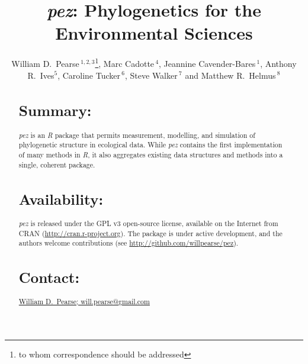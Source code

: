 \documentclass{bioinfo}
\begin{document}

\title[\emph{pez}]{\emph{pez}: Phylogenetics for the Environmental
  Sciences} \author[Pearse \textit{et~al}]{William D.\
  Pearse\,$^{1,2,3}$\footnote{to whom correspondence should be
    addressed}, Marc Cadotte\,$^{4}$, Jeannine Cavender-Bares\,$^1$,
  Anthony R.\ Ives$^5$, Caroline Tucker\,$^6$, Steve Walker\,$^7$ and
  Matthew R.\ Helmus\,$^8$} \address{$^1$Department of Ecology,
  Evolution, and Behavior, University of Minnesota, 100 Ecology
  Building, 1987 Upper Buford Circle, Saint Paul, Minnesota, USA,
  $^2$Department of Biology, McGill University, 1205 Avenue Docteur
  Penfield, Montr\'{e}al, Qu\'{e}bec, Canada, $^3$D\'{e}partement des
  Sciences Biologiques, Universit\'{e} du Qu\'{e}bec \`{a}
  Montr\'{e}al, Succursale Centre-ville, Montr\'{e}al, Qu\'{e}bec,
  Canada, $^4$Department of Biological Sciences, University of
  Toronto–Scarborough, 1265 Military Trail, Scarborough, Ontario,
  Canada, $^5$Department of Zoology, University of Wisconsin, Madison,
  Wisconsin, USA $^6$Department of Ecology and Evolutionary Biology,
  University of Colorado, Boulder, CO, USA, $^7$Department of
  Mathematics and Statistics, McMaster University, Hamilton, Ontario,
  Canada, $^8$Department of Animal Ecology, Vrije Universiteit, 1081
  HV, Amsterdam, The Netherlands} \history{} \editor{}
\maketitle
\begin{abstract}
\section{Summary:}
\emph{pez} is an \emph{R} package that permits measurement, modelling,
and simulation of phylogenetic structure in ecological data. While
\emph{pez} contains the first implementation of many methods in
\emph{R}, it also aggregates existing data structures and methods into
a single, coherent package.
\section{Availability:}
\emph{pez} is released under the GPL v3 open-source license, available
on the Internet from CRAN
(\href{http://cran.r-project.org}{http://cran.r-project.org}). The
package is under active development, and the authors welcome
contributions (see
\href{http://github.com/willpearse/pez}{http://github.com/willpearse/pez}).
\section{Contact:} \href{will.pearse@gmail.com}{William D.\ Pearse; will.pearse@gmail.com}
\end{abstract}
\end{document}
